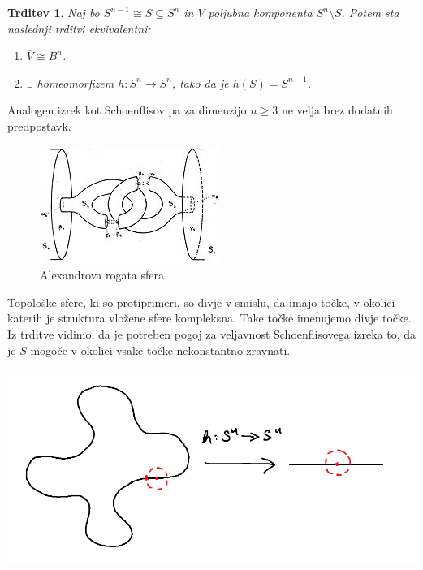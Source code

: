 \documentclass[10pt, a4paper]{article}
\newtheorem{trditev}[izr]{Trditev}
\begin{document}
\begin{trditev}
  Naj bo $S^{n - 1} \cong S \subseteq S^n$ in $V$ poljubna komponenta $S^n \setminus S$.
  Potem sta naslednji trditvi ekvivalentni:
  \begin{enumerate}
    \item $\overline{V} \cong B^n$.
    \item $\exists$ homeomorfizem $h: S^n \to S^n$, tako da je $h(S) = S^{n - 1}$.
  \end{enumerate}
\end{trditev}

Analogen izrek kot Schoenflisov pa za dimenzijo $n \geq 3$ ne velja brez dodatnih predpostavk.

\begin{figure}[h!]
  \centering
  \includegraphics[scale=0.7]{alexander.jpg}
  \caption{Alexandrova rogata sfera}
\end{figure}

Topološke sfere, ki so protiprimeri, so divje v smislu, da imajo točke, v okolici katerih je struktura 
vložene sfere kompleksna. Take točke imenujemo divje točke.
Iz trditve vidimo, da je potreben pogoj za veljavnost Schoenflisovega izreka to,
da je $S$ mogoče v okolici vsake točke nekonstantno zravnati.

\begin{center}
  \includegraphics[scale=0.7]{schoenflis1.png}
\end{center}
\end{document}
